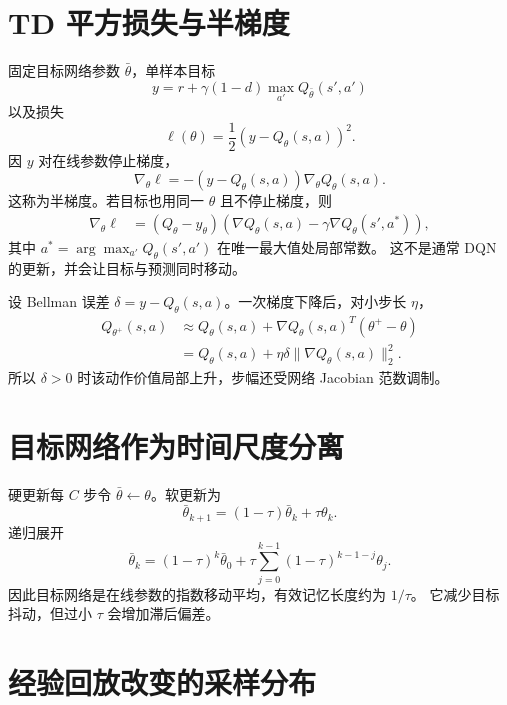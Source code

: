 \documentclass[11pt]{article}
\numberwithin{equation}{section}
\newcommand{\1}{\mathbf{1}}
\begin{document}
\section{TD 平方损失与半梯度}

固定目标网络参数 $\bar\theta$，单样本目标
\begin{equation}
 y=r+\gamma(1-d)\max_{a'}Q_{\bar\theta}(s',a')
\end{equation}
以及损失
\begin{equation}
 \ell(\theta)=\frac12(y-Q_\theta(s,a))^2.
\end{equation}
因 $y$ 对在线参数停止梯度，
\begin{equation}
 \nabla_\theta\ell
 =-(y-Q_\theta(s,a))\nabla_\theta Q_\theta(s,a).
\end{equation}
这称为半梯度。若目标也用同一 $\theta$ 且不停止梯度，则
\begin{align}
 \nabla_\theta\ell
 &=(Q_\theta-y_\theta)
 \left(\nabla Q_\theta(s,a)
 -\gamma\nabla Q_\theta(s',a^*)\right),
\end{align}
其中 $a^*=\arg\max_{a'}Q_\theta(s',a')$ 在唯一最大值处局部常数。
这不是通常 DQN 的更新，并会让目标与预测同时移动。

设 Bellman 误差 $\delta=y-Q_\theta(s,a)$。一次梯度下降后，对小步长 $\eta$，
\begin{align}
 Q_{\theta^+}(s,a)
 &\approx Q_\theta(s,a)+
 \nabla Q_\theta(s,a)^T(\theta^+-\theta)\\
 &=Q_\theta(s,a)+\eta\delta
 \|\nabla Q_\theta(s,a)\|_2^2.
\end{align}
所以 $\delta>0$ 时该动作价值局部上升，步幅还受网络 Jacobian 范数调制。

\section{目标网络作为时间尺度分离}

硬更新每 $C$ 步令 $\bar\theta\leftarrow\theta$。软更新为
\begin{equation}
 \bar\theta_{k+1}=(1-\tau)\bar\theta_k+\tau\theta_k.
\end{equation}
递归展开
\begin{equation}
 \bar\theta_k=(1-\tau)^k\bar\theta_0
 +\tau\sum_{j=0}^{k-1}(1-\tau)^{k-1-j}\theta_j.
\end{equation}
因此目标网络是在线参数的指数移动平均，有效记忆长度约为 $1/\tau$。
它减少目标抖动，但过小 $\tau$ 会增加滞后偏差。

\section{经验回放改变的采样分布}
\end{document}
